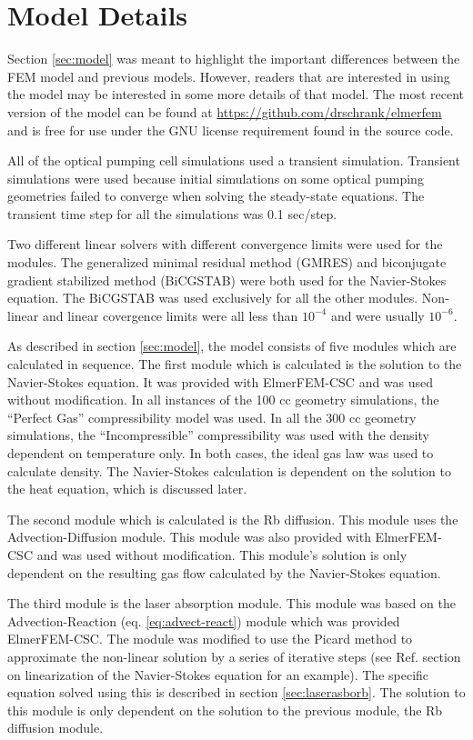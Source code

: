 \section{Model Details\label{sec:modeldetails}}
Section \ref{sec:model} was meant to highlight the important differences between the FEM model and previous models. However, readers that are interested in using the model may be interested in some more details of that model. The most recent version of the model can be found at \url{https://github.com/drschrank/elmerfem} and is free for use under the GNU license requirement found in the source code.

All of the optical pumping cell simulations used a transient simulation. Transient simulations were used because initial simulations on some optical pumping geometries failed to converge when solving the steady-state equations. The transient time step for all the simulations was 0.1 sec/step.

Two different linear solvers with different convergence limits were used for the modules. The generalized minimal residual method (GMRES) and biconjugate gradient stabilized method (BiCGSTAB) were both used for the Navier-Stokes equation. The BiCGSTAB was used exclusively for all the other modules. Non-linear and linear covergence limits were all less than $10^{-4}$ and were usually $10^{-6}$. 

As described in section \ref{sec:model}, the model consists of five modules which are calculated in sequence. The first module which is calculated is the solution to the Navier-Stokes equation. It was provided with ElmerFEM-CSC and was used without modification. In all instances of the 100 cc geometry simulations, the ``Perfect Gas'' compressibility model was used. In all the 300 cc geometry simulations, the ``Incompressible'' compressibility was used with the density dependent on temperature only. In both cases, the ideal gas law was used to calculate density. The Navier-Stokes calculation is dependent on the solution to the heat equation, which is discussed later. 

The second module which is calculated is the Rb diffusion. This module uses the Advection-Diffusion module. This module was also provided with ElmerFEM-CSC and was used without modification. This module's solution is only dependent on the resulting gas flow calculated by the Navier-Stokes equation.

The third module is the laser absorption module. This module was based on the Advection-Reaction (eq. \ref{eq:advect-react}) module which was provided ElmerFEM-CSC. The module was modified to use the Picard method to approximate the non-linear solution by a series of iterative steps (see Ref. \cite{Raback2015} section on linearization of the Navier-Stokes equation for an example). The specific equation solved using this is described in section \ref{sec:laserasborb}. The solution to this module is only dependent on the solution to the previous module, the Rb diffusion module.

